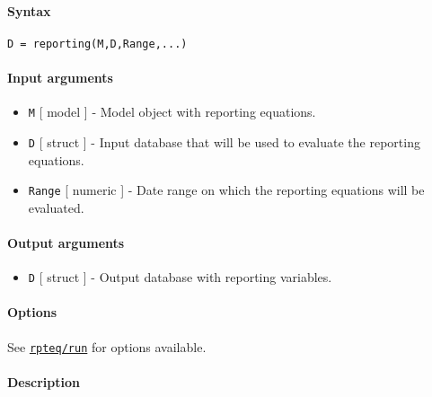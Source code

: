 


	\paragraph{Syntax}

\begin{verbatim}
D = reporting(M,D,Range,...)
\end{verbatim}

\paragraph{Input arguments}

\begin{itemize}
\item
  \texttt{M} {[} model {]} - Model object with reporting equations.
\item
  \texttt{D} {[} struct {]} - Input database that will be used to
  evaluate the reporting equations.
\item
  \texttt{Range} {[} numeric {]} - Date range on which the reporting
  equations will be evaluated.
\end{itemize}

\paragraph{Output arguments}

\begin{itemize}
\itemsep1pt\parskip0pt
\item
  \texttt{D} {[} struct {]} - Output database with reporting variables.
\end{itemize}

\paragraph{Options}

See \href{rpteq/run}{\texttt{rpteq/run}} for options available.

\paragraph{Description}


